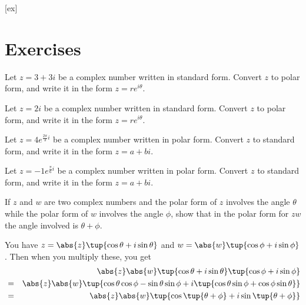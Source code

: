 [ex]
\section*{Exercises}

\begin{enumialphparenastyle}

\begin{ex} Let $z = 3 + 3i$ be a complex number written in standard form. Convert $z$ to polar form, and write it in the form $z = re^{i\theta}$.
\end{ex}

\begin{ex} Let $z = 2i$ be a complex number written in standard form. Convert $z$ to polar form, and write it in the form $z = re^{i\theta}$.
\end{ex}

\begin{ex} Let $z = 4e^{\frac{2\pi}{3}i}$ be a complex number written in polar form. Convert $z$ to standard form, and write it in the form $z = a+bi$.
\end{ex}

\begin{ex} Let $z = -1e^{\frac{\pi}{6}i}$ be a complex number written in polar form. Convert $z$ to standard form, and write it in the form $z = a+bi$.
\end{ex}

\begin{ex} If $z$ and $w$ are two complex numbers and the polar form of $z$
involves the angle $\theta $ while the polar form of $w$ involves the angle 
$\phi $, show that in the polar form for $zw$ the angle involved is $\theta
+\phi $. 
\begin{sol}
 You have $z=\abs{z}\tup{\cos
\theta +i\sin \theta } $ and $w=\abs{w}\tup{\cos
\phi +i\sin \phi } $. Then when you multiply these, you get
\begin{eqnarray*}
&&\abs{z}\abs{w}\tup{\cos \theta +i\sin
\theta } \tup{\cos \phi +i\sin \phi } \\
&=&\abs{z}\abs{w}\tup{\cos \theta \cos
\phi -\sin \theta \sin \phi +i\tup{\cos \theta \sin \phi +\cos \phi \sin
\theta } } \\
&=&\abs{z}\abs{w}\tup{\cos \tup{\theta
+\phi } +i\sin \tup{\theta +\phi } }
\end{eqnarray*}
\end{sol}
\end{ex}

\end{enumialphparenastyle}